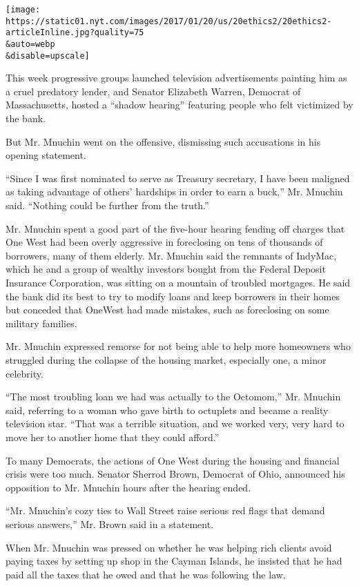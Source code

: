 \texttt{[image: https://static01.nyt.com/images/2017/01/20/us/20ethics2/20ethics2-articleInline.jpg?quality=75\\\&auto=webp\\\&disable=upscale]}

This week progressive groups launched television advertisements painting
him as a cruel predatory lender, and Senator Elizabeth Warren, Democrat
of Massachusetts, hosted a ``shadow hearing'' featuring people who felt
victimized by the bank.

But Mr. Mnuchin went on the offensive, dismissing such accusations in
his opening statement.

``Since I was first nominated to serve as Treasury secretary, I have
been maligned as taking advantage of others' hardships in order to earn
a buck,'' Mr. Mnuchin said. ``Nothing could be further from the truth.''

Mr. Mnuchin spent a good part of the five-hour hearing fending off
charges that One West had been overly aggressive in foreclosing on tens
of thousands of borrowers, many of them elderly. Mr. Mnuchin said the
remnants of IndyMac, which he and a group of wealthy investors bought
from the Federal Deposit Insurance Corporation, was sitting on a
mountain of troubled mortgages. He said the bank did its best to try to
modify loans and keep borrowers in their homes but conceded that OneWest
had made mistakes, such as foreclosing on some military families.

Mr. Mnuchin expressed remorse for not being able to help more homeowners
who struggled during the collapse of the housing market, especially one,
a minor celebrity.

``The most troubling loan we had was actually to the Octomom,'' Mr.
Mnuchin said, referring to a woman who gave birth to octuplets and
became a reality television star. ``That was a terrible situation, and
we worked very, very hard to move her to another home that they could
afford.''

To many Democrats, the actions of One West during the housing and
financial crisis were too much. Senator Sherrod Brown, Democrat of Ohio,
announced his opposition to Mr. Mnuchin hours after the hearing ended.

``Mr. Mnuchin's cozy ties to Wall Street raise serious red flags that
demand serious answers,'' Mr. Brown said in a statement.

When Mr. Mnuchin was pressed on whether he was helping rich clients
avoid paying taxes by setting up shop in the Cayman Islands, he insisted
that he had paid all the taxes that he owed and that he was following
the law.

